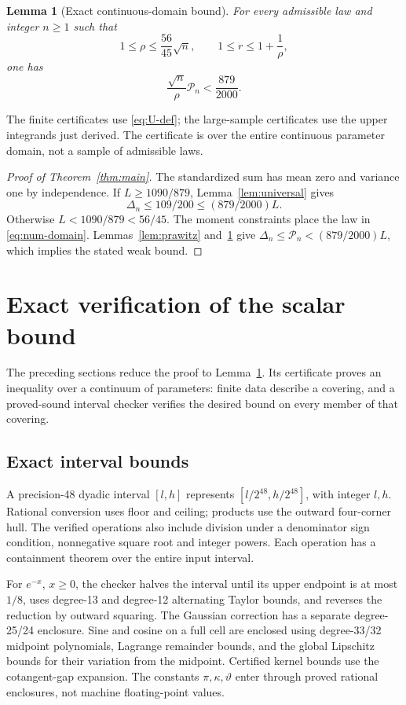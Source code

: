 \documentclass[11pt]{article}
\newtheorem{lemma}[theorem]{Lemma}
\begin{document}
\begin{lemma}[Exact continuous-domain bound]\label{lem:numerical}
For every admissible law and integer \(n\ge1\) such that
\[
 1\le\rho\le\frac{56}{45}\sqrt n,\qquad
 1\le r\le1+\frac1\rho,
 \label{eq:num-domain}\tag{4.7}
\]
one has
\[
 \frac{\sqrt n}{\rho}\mathcal P_n<\frac{879}{2000}.
 \label{eq:num-bound}\tag{4.8}
\]
\end{lemma}

The finite certificates use \eqref{eq:U-def}; the large-sample
certificates use the upper integrands just derived. The certificate
is over the entire continuous parameter domain, not a sample of
admissible laws.

\begin{proof}[Proof of Theorem~\ref{thm:main}]
The standardized sum has mean zero and variance one by independence.
If \(L\ge1090/879\), Lemma~\ref{lem:universal} gives
\[
 \Delta_n\le109/200\le(879/2000)L.
\]
Otherwise \(L<1090/879<56/45\). The moment constraints place the law
in \eqref{eq:num-domain}. Lemmas~\ref{lem:prawitz}
and~\ref{lem:numerical} give
\(\Delta_n\le\mathcal P_n<(879/2000)L\), which implies the stated
weak bound.
\end{proof}

\section{Exact verification of the scalar bound}\label{sec:certificate}

The preceding sections reduce the proof to Lemma~\ref{lem:numerical}.  Its
certificate proves an inequality over a continuum of parameters: finite data
describe a covering, and a proved-sound interval checker verifies the desired
bound on every member of that covering.

\subsection{Exact interval bounds}

A precision-48 dyadic interval \([l,h]\) represents
\([l/2^{48},h/2^{48}]\), with integer \(l,h\).
Rational conversion uses floor and ceiling; products use the outward
four-corner hull. The verified operations also include division under
a denominator sign condition, nonnegative square root and integer
powers. Each operation has a containment theorem over the entire
input interval.

For \(e^{-x}\), \(x\ge0\), the checker halves the interval until its
upper endpoint is at most \(1/8\), uses degree-13 and degree-12
alternating Taylor bounds, and reverses the reduction by outward
squaring. The Gaussian correction has a separate degree-25/24
enclosure. Sine and cosine on a full cell are enclosed using
degree-33/32 midpoint polynomials, Lagrange remainder bounds, and
the global Lipschitz bounds for their variation from the midpoint.
Certified kernel bounds use the cotangent-gap expansion.
The constants \(\pi,\kappa,\vartheta\) enter through proved rational
enclosures, not machine floating-point values.
\end{document}
